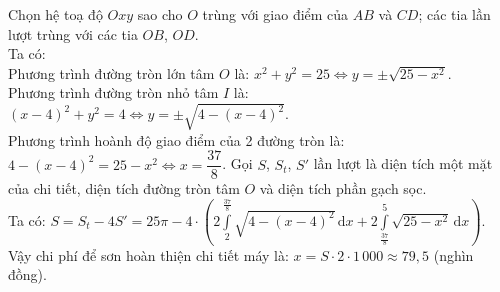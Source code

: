 \begin{bt}
{\begin{center}
\begin{tikzpicture}[scale=1, font=\footnotesize, line join=round, line cap=round, >=stealth]
			\end{tikzpicture}
		\end{center}
		Chọn hệ toạ độ $Oxy$ sao cho $O$ trùng với giao điểm của $AB$ và $CD$; các tia lần lượt trùng với các tia $OB$, $OD$. \\
		Ta có:\\
		Phương trình đường tròn lớn tâm $O$ là: $x^2+y^2=25\Leftrightarrow y=\pm\sqrt{25-x^2}$.\\
		Phương trình đường tròn nhỏ tâm $I$ là: $(x-4)^2+y^2=4\Leftrightarrow y=\pm\sqrt{4-(x-4)^2}$.\\
		Phương trình hoành độ giao điểm của 2 đường tròn là: $4-(x-4)^2=25-x^2\Leftrightarrow x=\dfrac{37}{8}$.
		Gọi $S$, $S_t$, $S'$ lần lượt là diện tích một mặt của chi tiết, diện tích đường tròn tâm $O$ và diện tích phần gạch sọc.\\
		Ta có: $S=S_t-4S'=25\pi -4\cdot \left(2\displaystyle\int\limits _2^{\tfrac{37}{8}}\sqrt{4-(x-4)^2}\mathrm{\, d}x+2\displaystyle\int\limits _{\tfrac{37}{8}}^5\sqrt{25-x^2}\mathrm{\, d}x\right)$.\\
		Vậy chi phí để sơn hoàn thiện chi tiết máy là: $x=S\cdot 2\cdot 1\,000\approx 79{,}5$ (nghìn đồng).
	}
\end{bt}

